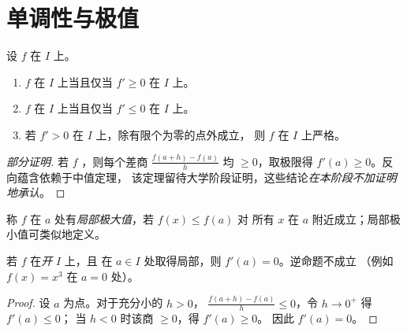 \section{单调性与极值}

\begin{theorem}[导数的符号与单调性]\label{thm:g12:deriv:variations}
设 $f$ 在 $I$ 上。
\begin{enumerate}
  \item $f$ 在 $I$ 上当且仅当 $f' \geq 0$ 在 $I$ 上。
  \item $f$ 在 $I$ 上当且仅当 $f' \leq 0$ 在 $I$ 上。
  \item 若 $f' > 0$ 在 $I$ 上，除有限个为零的点外成立，
        则 $f$ 在 $I$ 上严格。
\end{enumerate}
\end{theorem}

\begin{proof}[部分证明]
若 $f$ ，则每个差商
$\frac{f(a+h)-f(a)}{h}$ 均 $\geq 0$，取极限得
$f'(a) \geq 0$。反向蕴含依赖于中值定理，
该定理留待大学阶段证明，这些结论\emph{在本阶段不加证明地承认}。
\end{proof}

\begin{definition}[局部极值]\label{def:g12:deriv:extremum}
称 $f$ 在 $a$ 处有\emph{局部极大值}，若 $f(x) \leq f(a)$ 对
所有 $x$ 在 $a$ 附近成立；局部极小值可类似地定义。
\end{definition}

\begin{proposition}[一阶条件]\label{prop:g12:deriv:critical}
若 $f$ 在\emph{开} $I$ 上，且
在 $a \in I$ 处取得局部，则 $f'(a) = 0$。逆命题不成立
（例如 $f(x) = x^3$ 在 $a = 0$ 处）。
\end{proposition}

\begin{proof}
设 $a$ 为点。对于充分小的 $h > 0$，
$\frac{f(a+h)-f(a)}{h} \leq 0$，令 $h \to 0^+$ 得 $f'(a) \leq 0$；
当 $h < 0$ 时该商 $\geq 0$，得 $f'(a) \geq 0$。
因此 $f'(a) = 0$。
\end{proof}

